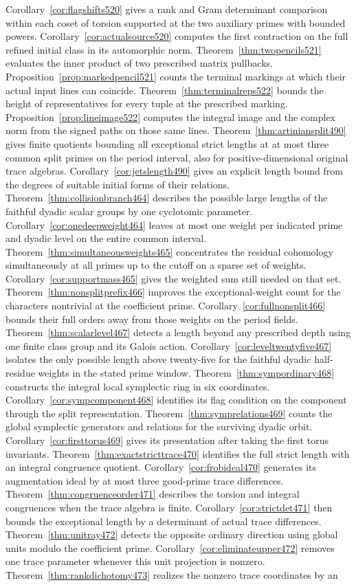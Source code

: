 \documentclass[a4paper,11pt]{article}
\theoremstyle{definition}
\theoremstyle{remark}
\numberwithin{equation}{section}
\begin{document}
Corollary~\ref{cor:flagshifts520} gives a rank and Gram determinant comparison within each coset of torsion supported at the two auxiliary primes with bounded powers. Corollary~\ref{cor:actualsource520} computes the first contraction on the full refined initial class in its automorphic norm. Theorem~\ref{thm:twopencils521} evaluates the inner product of two prescribed matrix pullbacks. Proposition~\ref{prop:markedpencil521} counts the terminal markings at which their actual input lines can coincide. Theorem~\ref{thm:terminalreps522} bounds the height of representatives for every tuple at the prescribed marking. Proposition~\ref{prop:lineimage522} computes the integral image and the complex norm from the signed paths on those same lines. Theorem~\ref{thm:artiniansplit490} gives finite quotients bounding all exceptional strict lengths at at most three common split primes on the period interval, also for positive-dimensional original trace algebras. Corollary~\ref{cor:jetslength490} gives an explicit length bound from the degrees of suitable initial forms of their relations. Theorem~\ref{thm:collisionbranch464} describes the possible large lengths of the faithful dyadic scalar groups by one cyclotomic parameter. Corollary~\ref{cor:onedeepweight464} leaves at most one weight per indicated prime and dyadic level on the entire common interval. Theorem~\ref{thm:simultaneousweights465} concentrates the residual cohomology simultaneously at all primes up to the cutoff on a sparse set of weights. Corollary~\ref{cor:supportmass465} gives the weighted sum still needed on that set. Theorem~\ref{thm:nonsplitprefix466} improves the exceptional-weight count for the characters nontrivial at the coefficient prime. Corollary~\ref{cor:fullnonsplit466} bounds their full orders away from those weights on the period fields. Theorem~\ref{thm:scalarlevel467} detects a length beyond any prescribed depth using one finite class group and its Galois action. Corollary~\ref{cor:leveltwentyfive467} isolates the only possible length above twenty-five for the faithful dyadic half-residue weights in the stated prime window. Theorem~\ref{thm:sympordinary468} constructs the integral local symplectic ring in six coordinates. Corollary~\ref{cor:sympcomponent468} identifies its flag condition on the component through the split representation. Theorem~\ref{thm:symprelations469} counts the global symplectic generators and relations for the surviving dyadic orbit. Corollary~\ref{cor:firsttorus469} gives its presentation after taking the first torus invariants. Theorem~\ref{thm:exactstricttrace470} identifies the full strict length with an integral congruence quotient. Corollary~\ref{cor:frobideal470} generates its augmentation ideal by at most three good-prime trace differences. Theorem~\ref{thm:congruenceorder471} describes the torsion and integral congruences when the trace algebra is finite. Corollary~\ref{cor:strictdet471} then bounds the exceptional length by a determinant of actual trace differences. Theorem~\ref{thm:unitray472} detects the opposite ordinary direction using global units modulo the coefficient prime. Corollary~\ref{cor:eliminateupper472} removes one trace parameter whenever this unit projection is nonzero. Theorem~\ref{thm:rankdichotomy473} realizes the nonzero trace coordinates by an 
\end{document}
